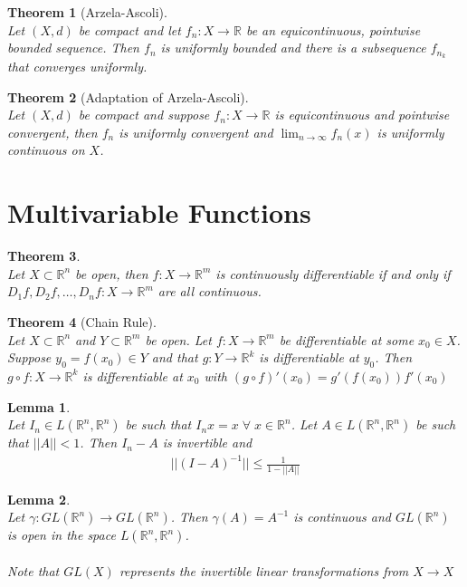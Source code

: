 \documentclass[10pt,a4paper]{article}
\newtheorem{theorem}{Theorem}
\newtheorem{lemma}{Lemma}
\theoremstyle{definition}
\theoremstyle{definition}
\numberwithin{equation}{section}
\numberwithin{theorem}{section}
\numberwithin{proposition}{section}
\numberwithin{lemma}{section}
\numberwithin{corollary}{section}
\begin{document}
\begin{theorem}[Arzela-Ascoli]$ $
\\Let $(X, d)$ be compact and let $f_n : X \to \mathbb{R}$ be an equicontinuous, pointwise bounded sequence. Then $f_n$ is uniformly bounded and there is a subsequence $f_{n_k}$ that converges uniformly. 
\end{theorem}

\begin{theorem}[Adaptation of Arzela-Ascoli]$ $
\\Let $(X, d)$ be compact and suppose $f_n : X \to \mathbb{R}$ is equicontinuous and pointwise convergent, then $f_n$ is uniformly convergent and $\lim_{n \to \infty} f_n(x)$ is uniformly continuous on $X$. 
\end{theorem}


\newpage 


\section{Multivariable Functions}

\begin{theorem}$ $
\\Let $X \subset \mathbb{R}^n$ be open, then $f: X \to \mathbb{R}^m$ is continuously differentiable if and only if $D_1f, D_2f, \ldots, D_nf: X \to \mathbb{R}^m$ are all continuous. 
\end{theorem}


\begin{theorem}[Chain Rule]$ $
\\Let $X \subset \mathbb{R}^n$ and $Y \subset \mathbb{R}^m$ be open. Let $f: X \to \mathbb{R}^m$ be differentiable at some $x_0 \in X$. Suppose $y_0 = f(x_0) \in Y$ and that $g: Y \to \mathbb{R}^k$ is differentiable at $y_0$. Then $g \circ f: X \to \mathbb{R}^k$ is differentiable at $x_0$ with $(g \circ f)'(x_0) = g'(f(x_0))f'(x_0)$
\end{theorem}

\begin{lemma}$ $
\\Let $I_n \in L(\mathbb{R}^n, \mathbb{R}^n)$ be such that $I_n x = x \; \forall \; x \in \mathbb{R}^n$. Let $A \in L(\mathbb{R}^n, \mathbb{R}^n)$ be such that $||A|| < 1$. Then $I_n - A$ is invertible and 
\begin{align*}
||(I - A)^{-1}|| \leq \frac{1}{1 - ||A||}
\end{align*}
\end{lemma}

\begin{lemma}$ $
\\Let $\gamma: GL(\mathbb{R}^n) \to GL(\mathbb{R}^n)$. Then $\gamma(A) = A^{-1}$ is continuous and $GL(\mathbb{R}^n)$ is open in the space $L(\mathbb{R}^n, \mathbb{R}^n)$. 
\\
\\\textit{Note that $GL(X)$ represents the invertible linear transformations from $X \to X$}
\end{lemma}
\end{document}

